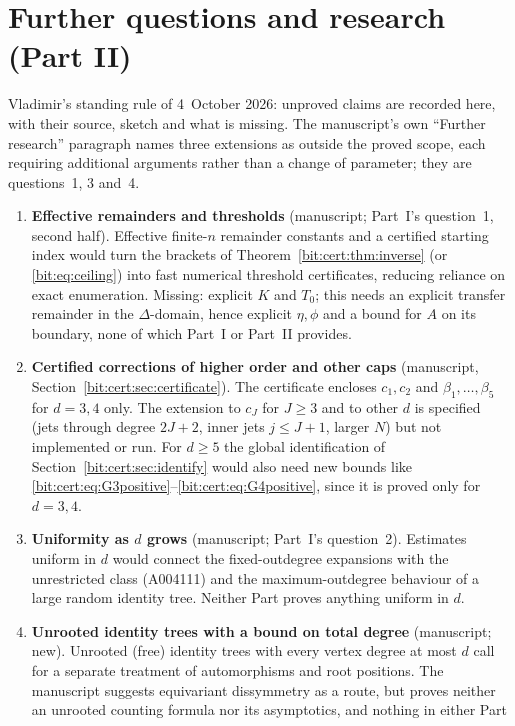 \documentclass[11pt]{article}
\theoremstyle{definition}\newtheorem{definition}[theorem]{Definition}
\theoremstyle{remark}\newtheorem{remark}[theorem]{Remark}
\begin{document}
\section{Further questions and research (Part II)}\label{bit:cert:sec:further}
Vladimir's standing rule of 4~October 2026: unproved claims are recorded here,
with their source, sketch and what is missing. The manuscript's own
``Further research'' paragraph names three extensions as outside the proved
scope, each requiring additional arguments rather than a change of parameter;
they are questions~1, 3 and~4.
\begin{enumerate}
\item \textbf{Effective remainders and thresholds} (manuscript; Part~I's
 question~1, second half). Effective finite-$n$ remainder constants and a
 certified starting index would turn the brackets of
 Theorem~\ref{bit:cert:thm:inverse} (or \eqref{bit:eq:ceiling}) into fast
 numerical threshold certificates, reducing reliance on exact enumeration.
 Missing: explicit $K$ and $T_0$; this needs an explicit transfer remainder in
 the $\Delta$-domain, hence explicit $\eta,\phi$ and a bound for $A$ on its
 boundary, none of which Part~I or Part~II provides.
\item \textbf{Certified corrections of higher order and other caps}
 (manuscript, Section~\ref{bit:cert:sec:certificate}). The certificate encloses
 $c_1,c_2$ and $\beta_1,\ldots,\beta_5$ for $d=3,4$ only. The extension to
 $c_J$ for $J\ge3$ and to other $d$ is specified (jets through degree $2J+2$,
 inner jets $j\le J+1$, larger $N$) but not implemented or run. For $d\ge5$ the
 global identification of Section~\ref{bit:cert:sec:identify} would also need
 new bounds like \eqref{bit:cert:eq:G3positive}--\eqref{bit:cert:eq:G4positive},
 since it is proved only for $d=3,4$.
\item \textbf{Uniformity as $d$ grows} (manuscript; Part~I's question~2).
 Estimates uniform in $d$ would connect the fixed-outdegree expansions with the
 unrestricted class (A004111) and the maximum-outdegree behaviour of a large
 random identity tree. Neither Part proves anything uniform in $d$.
\item \textbf{Unrooted identity trees with a bound on total degree}
 (manuscript; new). Unrooted (free) identity trees with every vertex degree at
 most $d$ call for a separate treatment of automorphisms and root positions.
 The manuscript suggests equivariant dissymmetry as a route, but proves neither
 an unrooted counting formula nor its asymptotics, and nothing in either Part

\end{enumerate}
\end{document}

